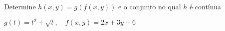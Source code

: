 Determine $h(x,y) = g(f(x,y))$ e o conjunto no qual $h$ é contínua

$g(t)=t^2 + \sqrt t, \quad f(x,y)=2x+3y-6$
